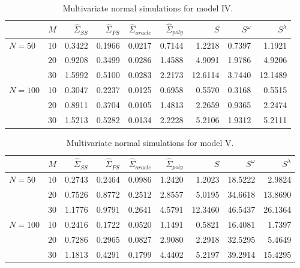 %
\begin{table}[H]
\centering
\caption{Multivariate normal simulations for model IV.}
\begin{tabular}{lrrrrrrrr}
 & $M$ &$\hat{\Sigma}_{SS}$& $\hat{\Sigma}_{PS}$ &$\hat{\Sigma}_{oracle}$& $\hat{\Sigma}_{poly}$ & $S$ &$S^\omega$& $S^\lambda$ \\ 
  \hline
 $N = 50$ & $10$ & 0.3422 & 0.1966 & 0.0217 & 0.7144 & 1.2218 & 0.7397 & 1.1921 \\ 
   & $20$ & 0.9208 & 0.3499 & 0.0286 & 1.4588 & 4.9091 & 1.9786 & 4.9206 \\ 
       & $30$ & 1.5992 & 0.5100 & 0.0283 & 2.2173 & 12.6114 & 3.7440 & 12.1489 \\ 
     $N = 100$ & 10 & 0.3047 & 0.2237 & 0.0125 & 0.6958 & 0.5570 & 0.3168 & 0.5515 \\ 
       & $20$ & 0.8911 & 0.3704 & 0.0105 & 1.4813 & 2.2659 & 0.9365 & 2.2474 \\ 
       & $30$ & 1.5213 & 0.5282 & 0.0134 & 2.2228 & 5.2106 & 1.9312 & 5.2111 \\ 
   \hline
\end{tabular} 
\label{table:simulation-1-entropy-loss-sigma-4}
\end{table}

%
\begin{table}[H]
\centering
\caption{Multivariate normal simulations for model V.}
\begin{tabular}{lrrrrrrrr}
 & $M$ &$\hat{\Sigma}_{SS}$& $\hat{\Sigma}_{PS}$ &$\hat{\Sigma}_{oracle}$& $\hat{\Sigma}_{poly}$ & $S$ &$S^\omega$& $S^\lambda$ \\ 
  \hline
 $N = 50$ & $10$ & 0.2743 & 0.2464 & 0.0986 & 1.2420 & 1.2023 & 18.5222 & 2.9824 \\ 
  & $20$ & 0.7526 & 0.8772 & 0.2512 & 2.8557 & 5.0195 & 34.6618 & 13.8690 \\ 
  & $30$ & 1.1776 & 0.9791 & 0.2641 & 4.5791 & 12.3460 & 46.5437 & 26.1364 \\ 
 $N = 100$ & 10 & 0.2416 & 0.1722 & 0.0520 & 1.1491 & 0.5821 & 16.4081 & 1.7397 \\ 
  & $20$ & 0.7286 & 0.2965 & 0.0827 & 2.9080 & 2.2918 & 32.5295 & 5.4649 \\ 
   & $30$ & 1.1813 & 0.4291 & 0.1799 & 4.4402 & 5.2197 & 39.2914 & 15.4295 \\ 
   \hline
\end{tabular}\label{table:simulation-1-entropy-loss-sigma-5}
\end{table}

